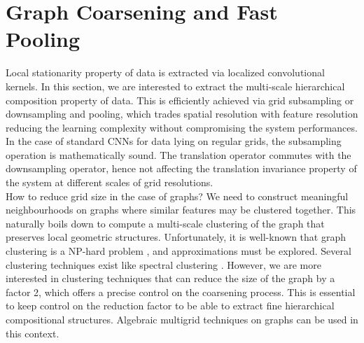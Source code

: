 \documentclass{article}
\begin{document}
\section{Graph Coarsening and Fast Pooling}
\vspace{-0.2cm}
Local stationarity property of data is extracted via localized convolutional kernels. In this section, we are interested to extract the multi-scale hierarchical composition property of data. This is efficiently achieved via grid subsampling or downsampling and pooling, which trades spatial resolution with feature resolution reducing the learning complexity without compromising the system performances. In the case of standard CNNs for data lying on regular grids, the subsampling operation is mathematically sound. The translation operator commutes with the downsampling operator, hence not affecting the translation invariance property of the system at different scales of grid resolutions.\\
How to reduce grid size in the case of graphs? We need to construct meaningful neighbourhoods on graphs where similar features may be clustered together. This naturally boils down to compute a multi-scale clustering of the graph that preserves local geometric structures. Unfortunately, it is well-known that graph clustering is a NP-hard problem \cite{art:BuiJonesGraphPartNPhard}, and approximations must be explored. Several clustering techniques exist like spectral clustering \cite{art:VonLuxburg07Tutorial}. However, we are more interested in clustering techniques that can reduce the size of the graph by a factor 2, which offers a precise control on the coarsening process. This is essential to keep control on the reduction factor to be able to extract fine hierarchical compositional structures. Algebraic multigrid techniques on graphs \cite{art:RonSafroBrandt11MultigridGraph} can be used in this context.\\
\end{document}
